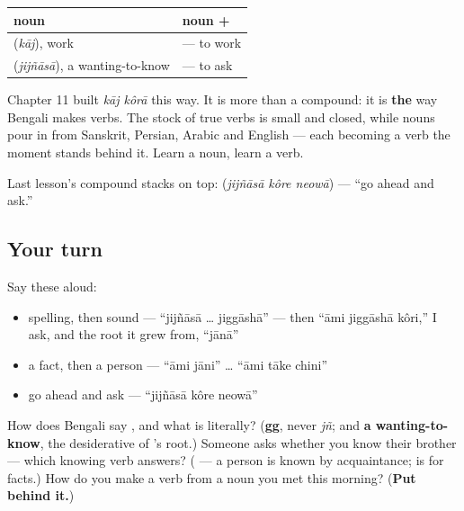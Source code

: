 \begin{grammarlens}[title={Grammar Lens: any noun plus \bn{করা} is a verb}]
\noindent
\begin{tabularx}{\linewidth}{@{}>{\raggedright\arraybackslash}X>{\raggedright\arraybackslash}X@{}}
\toprule
\textbf{noun} & \textbf{noun + \bn{করা}} \\
\midrule
\bn{কাজ} (\emph{kāj}), work & \bn{কাজ} \bn{করা} — to work \\
\bn{জিজ্ঞাসা} (\emph{jijñāsā}), a wanting-to-know & \bn{জিজ্ঞাসা} \bn{করা} — to ask \\
\bottomrule
\end{tabularx}

Chapter 11 built \emph{kāj kôrā} this way. It is more than a compound: it is \textbf{the} way Bengali makes verbs. The stock of true verbs is small and closed, while nouns pour in from Sanskrit, Persian, Arabic and English — each becoming a verb the moment  stands behind it. Learn a noun, learn a verb.

Last lesson’s compound stacks on top: \textbf{  } (\emph{jijñāsā kôre neowā}) — \textquotedblleft{}go ahead and ask.\textquotedblright{}
\end{grammarlens}

\subsection*{Your turn}
Say these aloud:

\begin{itemize}
\raggedright
  \item spelling, then sound — \textquotedblleft{}jijñāsā … jiggāshā\textquotedblright{} — then \textquotedblleft{}āmi jiggāshā kôri,\textquotedblright{} I ask, and the root it grew from, \textquotedblleft{}jānā\textquotedblright{}
  \item a fact, then a person — \textquotedblleft{}āmi jāni\textquotedblright{} … \textquotedblleft{}āmi tāke chini\textquotedblright{}
  \item go ahead and ask — \textquotedblleft{}jijñāsā kôre neowā\textquotedblright{}
\end{itemize}

\begin{tcolorbox}[breakable,colback=teal!4,colframe=teal!35!black,title={Before you move on}]
How does Bengali say \textbf{}, and what is  literally? (\textbf{gg}, never \emph{jñ}; and \textbf{a wanting-to-know}, the desiderative of 's root.) Someone asks whether you know their brother — which knowing verb answers? (\textbf{} — a person is known by acquaintance;  is for facts.) How do you make a verb from a noun you met this morning? (\textbf{Put  behind it.})
\end{tcolorbox}
